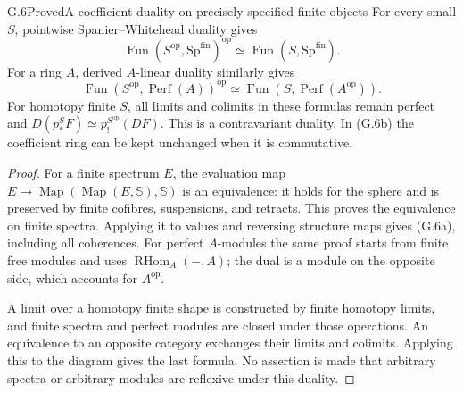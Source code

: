 \begin{claim}{G.6}{Proved}{A coefficient duality on precisely specified finite objects}
For every small $S$, pointwise Spanier--Whitehead duality gives
\[
 \operatorname{Fun}(S^{\mathrm{op}},\mathrm{Sp}^{\mathrm{fin}})^{\mathrm{op}}
 \simeq\operatorname{Fun}(S,\mathrm{Sp}^{\mathrm{fin}}).
\tag{G.6a}
\]
For a ring $A$, derived $A$-linear duality similarly gives
\[
 \operatorname{Fun}(S^{\mathrm{op}},\operatorname{Perf}(A))^{\mathrm{op}}
 \simeq\operatorname{Fun}(S,\operatorname{Perf}(A^{\mathrm{op}})).
\tag{G.6b}
\]
For homotopy finite $S$, all limits and colimits in these formulas
remain perfect and
$D(p_*^SF)\simeq p_!^{S^{\mathrm{op}}}(DF)$.
This is a contravariant duality. In (G.6b) the coefficient ring can
be kept unchanged when it is commutative.
\end{claim}
\begin{proof}
For a finite spectrum $E$, the evaluation map
$E\to\operatorname{Map}(\operatorname{Map}(E,\mathbb S),\mathbb S)$
is an equivalence: it holds for the sphere and is preserved by finite
cofibres, suspensions, and retracts. This proves the equivalence on
finite spectra. Applying it to values and reversing structure maps
gives (G.6a), including all coherences. For perfect $A$-modules the
same proof starts from finite free modules and uses
$\operatorname{RHom}_A(-,A)$; the dual is a module on the opposite
side, which accounts for $A^{\mathrm{op}}$.

A limit over a homotopy finite shape is constructed by finite
homotopy limits, and finite spectra and perfect modules are closed
under those operations. An equivalence to an opposite category
exchanges their limits and colimits. Applying this to the diagram
gives the last formula. No assertion is made that arbitrary
spectra or arbitrary modules are reflexive under this duality.
\end{proof}

